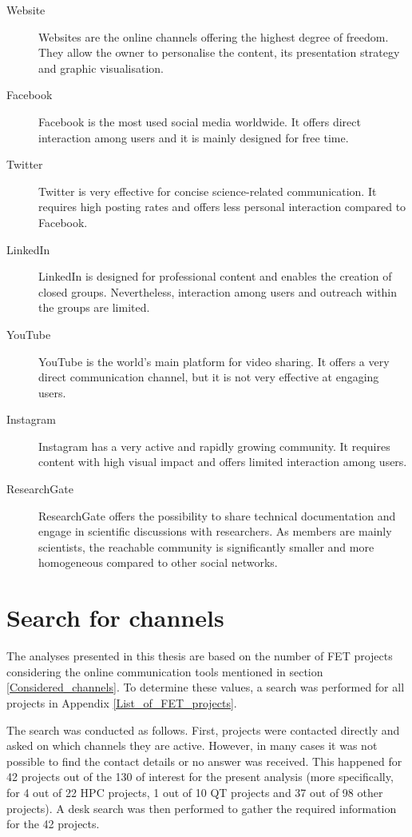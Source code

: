 \begin{description}
 \item [Website] Websites are the online channels offering the highest degree of freedom. They allow the owner to personalise the content, its presentation strategy and graphic visualisation.
 \item [Facebook] Facebook is the most used social media worldwide. It offers direct interaction among users and it is mainly designed for free time.  
 \item [Twitter] Twitter is very effective for concise science-related communication. It requires high posting rates and offers less personal interaction compared to Facebook.
 \item [LinkedIn] LinkedIn is designed for professional content and enables the creation of closed groups. Nevertheless, interaction among users and outreach within the groups are limited.
 \item [YouTube] YouTube is the world's main platform for video sharing. It offers a very direct communication channel, but it is not very effective at engaging users.
 \item [Instagram] Instagram has a very active and rapidly growing community. It requires content with high visual impact and offers limited interaction among users.
 \item [ResearchGate] ResearchGate offers the possibility to share technical documentation and engage in scientific discussions with researchers. As members are mainly scientists, the reachable community is significantly smaller and more homogeneous compared to other social networks.  
\end{description}

\section{Search for channels} \label{Search_for_channels}
The analyses presented in this thesis are based on the number of FET projects considering the online communication tools mentioned in section \ref{Considered_channels}. To determine these values, a search was performed for all projects in Appendix \ref{List_of_FET_projects}. 

The search was conducted as follows. First, projects were contacted directly and asked on which channels they are active. However, in many cases it was not possible to find the contact details or no answer was received. This happened for 42 projects out of the 130 of interest for the present analysis (more specifically, for 4 out of 22 HPC projects, 1 out of 10 QT projects and 37 out of 98 other projects). A desk search was then performed to gather the required information for the 42 projects. 

